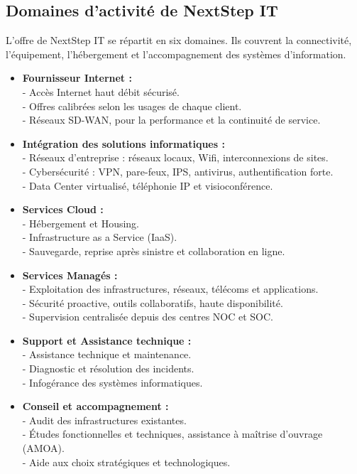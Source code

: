 \subsection{Domaines d'activité de NextStep IT}

L'offre de NextStep IT se répartit en six domaines. Ils couvrent la connectivité, l'équipement, l'hébergement et l'accompagnement des systèmes d'information.

\begin{itemize}
    \item \textbf{Fournisseur Internet :}\\
    - Accès Internet haut débit sécurisé.\\
    - Offres calibrées selon les usages de chaque client.\\
    - Réseaux SD-WAN, pour la performance et la continuité de service.

    \item \textbf{Intégration des solutions informatiques :}\\
    - Réseaux d'entreprise : réseaux locaux, Wifi, interconnexions de sites.\\
    - Cybersécurité : VPN, pare-feux, IPS, antivirus, authentification forte.\\
    - Data Center virtualisé, téléphonie IP et visioconférence.

    \item \textbf{Services Cloud :}\\
    - Hébergement et Housing.\\
    - Infrastructure as a Service (IaaS).\\
    - Sauvegarde, reprise après sinistre et collaboration en ligne.

    \item \textbf{Services Managés :}\\
    - Exploitation des infrastructures, réseaux, télécoms et applications.\\
    - Sécurité proactive, outils collaboratifs, haute disponibilité.\\
    - Supervision centralisée depuis des centres NOC et SOC.

    \item \textbf{Support et Assistance technique :}\\
    - Assistance technique et maintenance.\\
    - Diagnostic et résolution des incidents.\\
    - Infogérance des systèmes informatiques.

    \item \textbf{Conseil et accompagnement :}\\
    - Audit des infrastructures existantes.\\
    - Études fonctionnelles et techniques, assistance à maîtrise d'ouvrage (AMOA).\\
    - Aide aux choix stratégiques et technologiques.
\end{itemize}

